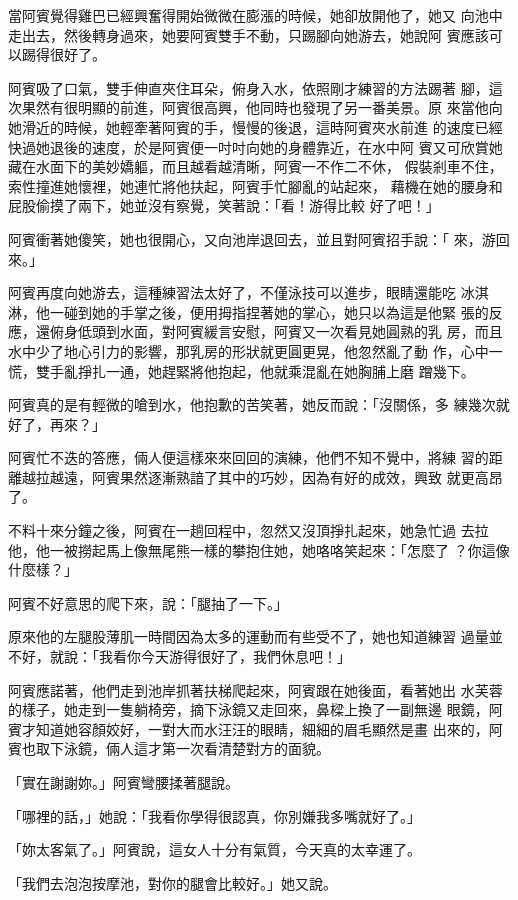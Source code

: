 當阿賓覺得雞巴已經興奮得開始微微在膨漲的時候，她卻放開他了，她又
向池中走出去，然後轉身過來，她要阿賓雙手不動，只踢腳向她游去，她說阿
賓應該可以踢得很好了。

阿賓吸了口氣，雙手伸直夾住耳朵，俯身入水，依照剛才練習的方法踢著
腳，這次果然有很明顯的前進，阿賓很高興，他同時也發現了另一番美景。原
來當他向她滑近的時候，她輕牽著阿賓的手，慢慢的後退，這時阿賓夾水前進
的速度已經快過她退後的速度，於是阿賓便一吋吋向她的身體靠近，在水中阿
賓又可欣賞她藏在水面下的美妙嬌軀，而且越看越清晰，阿賓一不作二不休，
假裝剎車不住，索性撞進她懷裡，她連忙將他扶起，阿賓手忙腳亂的站起來，
藉機在她的腰身和屁股偷摸了兩下，她並沒有察覺，笑著說：「看！游得比較
好了吧！」

阿賓衝著她傻笑，她也很開心，又向池岸退回去，並且對阿賓招手說：「
來，游回來。」

阿賓再度向她游去，這種練習法太好了，不僅泳技可以進步，眼睛還能吃
冰淇淋，他一碰到她的手掌之後，便用拇指捏著她的掌心，她只以為這是他緊
張的反應，還俯身低頭到水面，對阿賓緩言安慰，阿賓又一次看見她圓熟的乳
房，而且水中少了地心引力的影響，那乳房的形狀就更圓更晃，他忽然亂了動
作，心中一慌，雙手亂掙扎一通，她趕緊將他抱起，他就乘混亂在她胸脯上磨
蹭幾下。

阿賓真的是有輕微的嗆到水，他抱歉的苦笑著，她反而說：「沒關係，多
練幾次就好了，再來？」

阿賓忙不迭的答應，倆人便這樣來來回回的演練，他們不知不覺中，將練
習的距離越拉越遠，阿賓果然逐漸熟諳了其中的巧妙，因為有好的成效，興致
就更高昂了。

不料十來分鐘之後，阿賓在一趟回程中，忽然又沒頂掙扎起來，她急忙過
去拉他，他一被撈起馬上像無尾熊一樣的攀抱住她，她咯咯笑起來：「怎麼了
？你這像什麼樣？」

阿賓不好意思的爬下來，說：「腿抽了一下。」

原來他的左腿股薄肌一時間因為太多的運動而有些受不了，她也知道練習
過量並不好，就說：「我看你今天游得很好了，我們休息吧！」

阿賓應諾著，他們走到池岸抓著扶梯爬起來，阿賓跟在她後面，看著她出
水芙蓉的樣子，她走到一隻躺椅旁，摘下泳鏡又走回來，鼻樑上換了一副無邊
眼鏡，阿賓才知道她容顏姣好，一對大而水汪汪的眼睛，細細的眉毛顯然是畫
出來的，阿賓也取下泳鏡，倆人這才第一次看清楚對方的面貌。

「實在謝謝妳。」阿賓彎腰揉著腿說。

「哪裡的話，」她說：「我看你學得很認真，你別嫌我多嘴就好了。」

「妳太客氣了。」阿賓說，這女人十分有氣質，今天真的太幸運了。

「我們去泡泡按摩池，對你的腿會比較好。」她又說。

